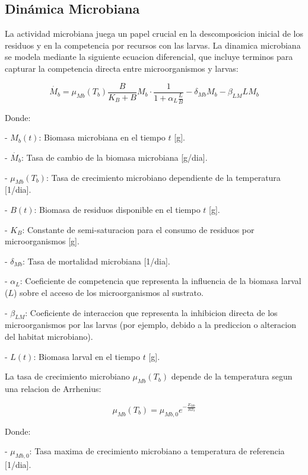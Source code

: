 \subsection{Dinámica Microbiana}

La actividad microbiana juega un papel crucial en la descomposicion inicial de los residuos y en la competencia por recursos con las larvas. La dinamica microbiana se modela mediante la siguiente ecuacion diferencial, que incluye terminos para capturar la competencia directa entre microorganismos y larvas:

\vspace{1cm}
\begin{equation}
\dot{M_b} = \mu_{Mb}(T_b) \frac{B}{K_B + B} M_b \cdot \frac{1}{1 + \alpha_L \frac{L}{B}} - \delta_{Mb} M_b - \beta_{LM} L M_b
\end{equation}

Donde:

- $M_b(t)$: Biomasa microbiana en el tiempo $t$ [g].

- $\dot{M_b}$: Tasa de cambio de la biomasa microbiana [g/dia].

- $\mu_{Mb}(T_b)$: Tasa de crecimiento microbiano dependiente de la temperatura [1/dia].

- $B(t)$: Biomasa de residuos disponible en el tiempo $t$ [g].

- $K_B$: Constante de semi-saturacion para el consumo de residuos por microorganismos [g].

- $\delta_{Mb}$: Tasa de mortalidad microbiana [1/dia].

- $\alpha_L$: Coeficiente de competencia que representa la influencia de la biomasa larval ($L$) sobre el acceso de los microorganismos al
sustrato.

- $\beta_{LM}$: Coeficiente de interaccion que representa la inhibicion directa de los microorganismos por las larvas (por ejemplo, debido a la prediccion o alteracion del habitat microbiano).

- $L(t)$: Biomasa larval en el tiempo $t$ [g].

\vspace{1cm}
La tasa de crecimiento microbiano $\mu_{Mb}(T_b)$ depende de la temperatura segun una relacion de Arrhenius:

\begin{equation}
\mu_{Mb}(T_b) = \mu_{Mb,0} e^{-\frac{E_{Mb}}{R T_b}}
\end{equation}

Donde:

- $\mu_{Mb,0}$: Tasa maxima de crecimiento microbiano a temperatura de referencia [1/dia].


